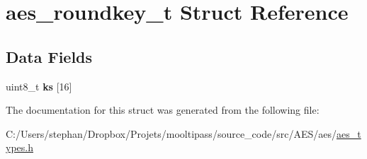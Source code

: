\hypertarget{structaes__roundkey__t}{\section{aes\-\_\-roundkey\-\_\-t Struct Reference}
\label{structaes__roundkey__t}
}
\subsection*{Data Fields}
\begin{DoxyCompactItemize}
\item 
\hypertarget{structaes__roundkey__t_a9289449e3402751c6996e0c14c3750b8}{uint8\-\_\-t {\bfseries ks} \mbox{[}16\mbox{]}}\label{structaes__roundkey__t_a9289449e3402751c6996e0c14c3750b8}

\end{DoxyCompactItemize}


The documentation for this struct was generated from the following file\-:\begin{DoxyCompactItemize}
\item 
C\-:/\-Users/stephan/\-Dropbox/\-Projets/mooltipass/source\-\_\-code/src/\-A\-E\-S/aes/\hyperlink{aes__types_8h}{aes\-\_\-types.\-h}\end{DoxyCompactItemize}
